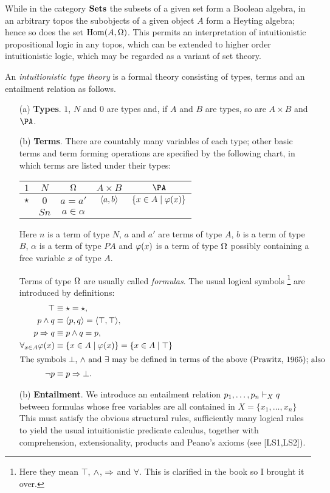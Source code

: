 While in the category ${\mathbf {Sets}}$ the subsets of a given set form a Boolean
algebra, in an arbitrary topos the subobjects of a given object $A$ form a
Heyting algebra; hence so does the set $\operatorname{{Hom}}(A,\Omega)$. This permits an 
interpretation of intuitionistic propositional logic in any topos, which can be
extended to higher order intuitionistic logic, which may be regarded as a
variant of set theory.

\begin{defn}
An {\em intuitionistic type theory} is a formal theory consisting of
types, terms and an entailment relation as follows.
\begin{enumerate}
\item[(a)] {\bf Types}. $1$, $N$ and $0$ are types and, if $A$ and $B$ are types, so
are $A \times B$ and $\PA$.
\item[(b)] {\bf Terms}. There are countably many variables of each type; other basic
terms and term forming operations are specified by the following chart, in
which terms are listed under their types:
\begin{center}
\begin{tabular}{ c c c c c }
$1$ & $N$ & $\Omega$ & $A \times B$ & $\PA$\\
\hline
$\star$ & $0$ & $a = a'$ & $\langle a,b \rangle$& $\{x \in A \mid \varphi (x)\}$\\
&$S n$&$a \in \alpha$\\
\end{tabular}
\end{center}
\medskip
Here $n$ is a term of type $N$, $a$ and $a'$ are terms of type $A$, $b$ is a term
of type $B$, $\alpha$ is a term of type $PA$ and $\varphi(x)$ is a term of type $\Omega$
possibly containing a free variable $x$ of type $A$.

Terms of type $\Omega$ are usually called {\em formulas}. The usual logical symbols%
\footnote{Here they mean $\top$, $\wedge$, $\Rightarrow$ and $\forall$. This is clarified in the book
so I brought it over.}
are introduced by definitions:
\begin{align*}
\top &\equiv \star = \star,\\
p \sland q &\equiv \la p,q \ra = \la \top, \top\ra,\\
p \impl q &\equiv p \sland q = p,\\
\forall_{x \in A} \pf(x) &\equiv \{ x \in A \mid \pf(x)\} = \{x \in A \mid \top\}\\
\intertext{The symbols $\bot$, $\wedge$ and $\exists$ may be defined in terms of the above (Prawitz,
1965); also}%
\neg p &\equiv p \impl \bot .
\end{align*}
\item[(b)] {\bf Entailment}. We introduce an entailment relation $p_1, \dots, p_n \vdash_X q$
between formulas whose free variables are all contained in $X = \{x_1, \dots, x_n\}$
This must satisfy the obvious structural rules, sufficiently many logical
rules to yield the usual intuitionistic predicate calculus, together with
comprehension, extensionality, products and Peano's axioms (see [LS1,LS2]).


\end{enumerate}
\end{defn}
